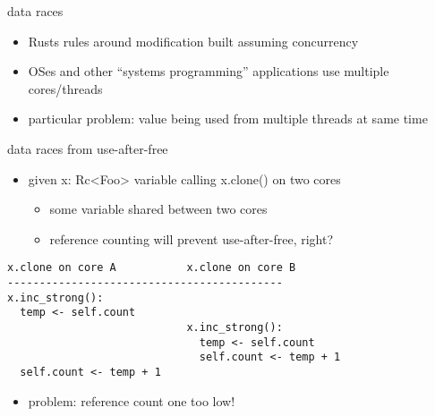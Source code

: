 \begin{frame}{data races}
    \begin{itemize}
    \item Rusts rules around modification built assuming concurrency
    \item OSes and other ``systems programming'' applications use multiple cores/threads
    \item particular problem: value being used from multiple threads at same time
    \end{itemize}
\end{frame}

\begin{frame}[fragile,label=raceUAF]{data races from use-after-free}
\begin{itemize}
\item given x: Rc<Foo> variable calling x.clone() on two cores
    \begin{itemize}
    \item some variable shared between two cores
    \item reference counting will prevent use-after-free, right?
    \end{itemize}
\end{itemize}
\begin{Verbatim}
x.clone on core A           x.clone on core B
-------------------------------------------
x.inc_strong():
  temp <- self.count
                            x.inc_strong():
                              temp <- self.count
                              self.count <- temp + 1
  self.count <- temp + 1
\end{Verbatim}
\begin{itemize}
\item problem: reference count one too low!
\end{itemize}
\end{frame}


